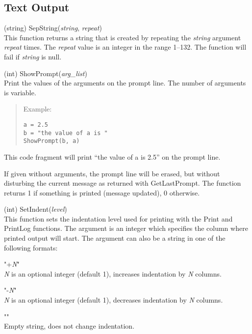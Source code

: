 \subsection{Text Output}

\begin{description}
\item{(string) \vt SepString({\it string\/}, {\it repeat\/})}\\
This function returns a string that is created by repeating the {\it
string} argument {\it repeat} times.  The {\it repeat} value is an
integer in the range 1--132.  The function will fail if {\it string} is
null.

\item{(int) \vt ShowPrompt({\it arg\_list\/})}\\
Print the values of the arguments on the prompt line.  The
number of arguments is variable.
\begin{quotation}
\noindent
Example:
\begin{verbatim}
a = 2.5
b = "the value of a is "
ShowPrompt(b, a)
\end{verbatim}
\end{quotation}
This code fragment will print ``{\vt the value of a is 2.5}'' on the
prompt line.

If given without arguments, the prompt line will be erased, but
without disturbing the current message as returned with {\vt
GetLastPrompt}.  The function returns 1 if something is printed
(message updated), 0 otherwise.

\item{(int) \vt SetIndent({\it level\/})}\\
This function sets the indentation level used for printing with the
{\vt Print} and {\vt PrintLog} functions.  The argument is an integer
which specifies the column where printed output will start.  The
argument can also be a string in one of the following formats:

\begin{description}
\item{\vt "+{\it N\/}"}\\
{\it N} is an optional integer (default 1), increases indentation
by {\it N} columns.
\item{\vt "-{\it N\/}"}\\
{\it N} is an optional integer (default 1), decreases indentation
by {\it N} columns.
\item{\vt ""}\\
Empty string, does not change indentation.
\end{description}


\end{description}
